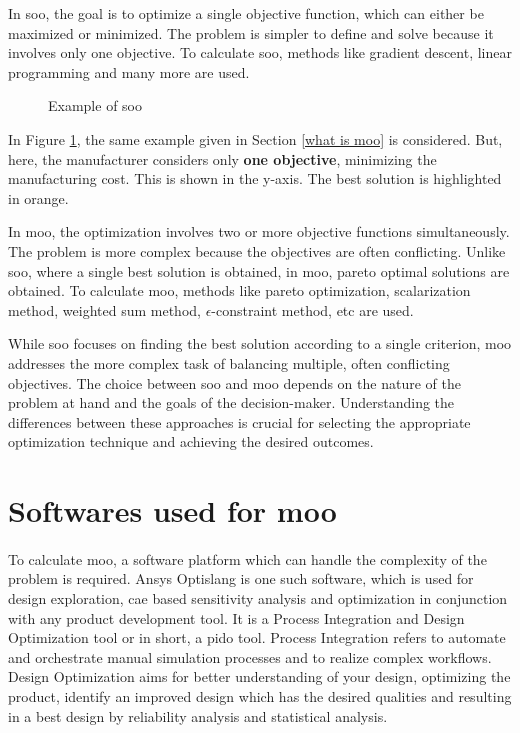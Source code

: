 In \acrfull{soo}, the goal is to optimize a single objective function, which can either be maximized or minimized. The  problem is simpler to define and solve
because it involves only one objective. To calculate \acrshort{soo}, methods like gradient descent, linear programming and many more are used.

\begin{figure}[!h]
    \centering
    
    \caption{Example of \acrshort{soo}}
    \label{soo}
\end{figure}

In Figure \ref{soo}, the same example given in Section \ref{what is moo} is considered. But, here, the manufacturer considers only \textbf{one objective}, minimizing 
the manufacturing cost. This is shown in the y-axis. The best solution is highlighted in orange.

In \acrshort{moo}, the optimization involves two or more objective functions simultaneously. The problem is more complex because the objectives are often
conflicting. Unlike \acrshort{soo}, where a single best solution is obtained, in \acrshort{moo}, pareto optimal solutions are obtained.
To calculate \acrshort{moo}, methods like pareto optimization, scalarization method, weighted sum method, $\epsilon$-constraint method, etc are used.


While \acrshort{soo} focuses on finding the best solution according to a single criterion, \acrshort{moo} addresses the more complex task of balancing multiple, 
often conflicting objectives. The choice between \acrshort{soo} and \acrshort{moo} depends on the nature of the problem at hand and the goals of the decision-maker. 
Understanding the differences between these approaches is crucial for selecting the appropriate optimization technique and achieving the desired outcomes.

\section{Softwares used for \acrlong{moo}}
\paragraph{}

To calculate \acrshort{moo}, a software platform which can handle the complexity of the problem is required. Ansys Optislang \cite{optislang} is one such software,  
which is used for design exploration, \acrfull{cae} based sensitivity analysis and optimization in conjunction with any product development tool. 
It is a Process Integration and Design Optimization tool or in short, a \acrshort{pido} tool. Process Integration refers to automate and orchestrate manual 
simulation processes and to realize complex workflows. Design Optimization aims for better understanding of your design, optimizing the product, identify an 
improved design which has the desired qualities and resulting in a best design by reliability analysis and statistical analysis.  


